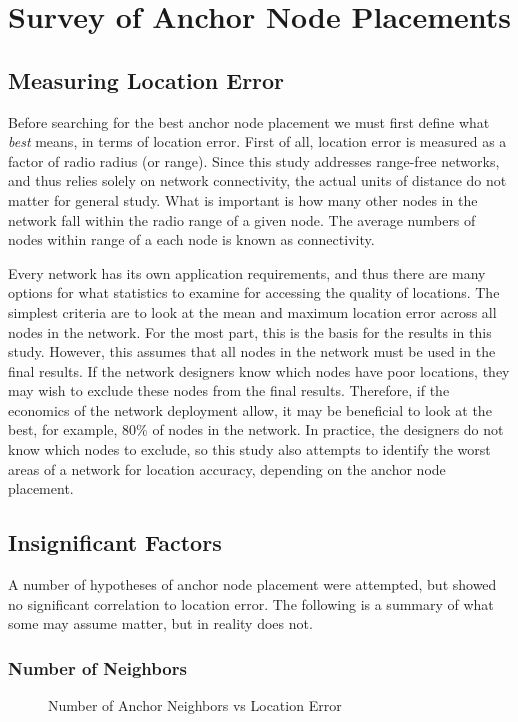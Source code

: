 \chapter{Survey of Anchor Node Placements}

\section{Measuring Location Error}
Before searching for the best anchor node placement we must first define what \emph{best} means, in terms of location error.  First of all, location error is measured as a factor of radio radius (or range).  Since this study addresses range-free networks, and thus relies solely on network connectivity, the actual units of distance do not matter for general study.  What is important is how many other nodes in the network fall within the radio range of a given node.  The average numbers of nodes within range of a each node is known as connectivity.

Every network has its own application requirements, and thus there are many options for what statistics to examine for accessing the quality of locations.  The simplest criteria are to look at the mean and maximum location error across all nodes in the network.  For the most part, this is the basis for the results in this study.  However, this assumes that all nodes in the network must be used in the final results.  If the network designers know which nodes have poor locations, they may wish to exclude these nodes from the final results.  Therefore, if the economics of the network deployment allow, it may be beneficial to look at the best, for example, 80\% of nodes in the network.  In practice, the designers do not know which nodes to exclude, so this study also attempts to identify the worst areas of a network for location accuracy, depending on the anchor node placement.  

\section{Insignificant Factors}
A number of hypotheses of anchor node placement were attempted, but showed no significant correlation to location error.  The following is a summary of what some may assume matter, but in reality does not.

\subsection{Number of Neighbors}
\begin{figure}
  \centering
    \caption{Number of Anchor Neighbors vs Location Error}
    \label{fig:Neighbors1}
\end{figure}

